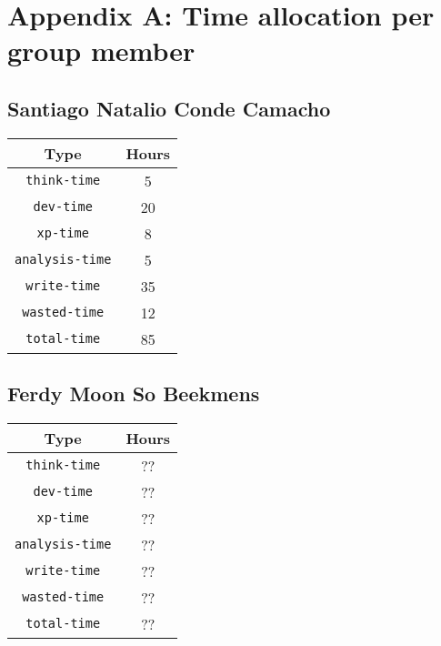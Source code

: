 \section{Appendix A: Time allocation per group member}
\subsection{Santiago Natalio Conde Camacho}

\begin{tabular}{ |c|c| } 
 \hline
 Type & Hours  \\ 
  \hline
 {\tt think-time} & 5 \\ 
  \hline
 {\tt dev-time} & 20 \\ 
  \hline
 {\tt xp-time} & 8 \\ 
  \hline
 {\tt analysis-time} & 5 \\
  \hline
 {\tt write-time} & 35 \\
  \hline
 {\tt wasted-time} & 12 \\ 
  \hline
 {\tt total-time} & 85 \\
 \hline
\end{tabular}

\subsection{Ferdy Moon So Beekmens}

\begin{tabular}{ |c|c| } 
 \hline
 Type & Hours  \\ 
  \hline
 {\tt think-time} & ?? \\ 
  \hline
 {\tt dev-time} & ?? \\ 
  \hline
 {\tt xp-time} & ?? \\ 
  \hline
 {\tt analysis-time} & ?? \\
  \hline
 {\tt write-time} & ?? \\
  \hline
 {\tt wasted-time} & ?? \\ 
  \hline
 {\tt total-time} & ?? \\
 \hline
\end{tabular}